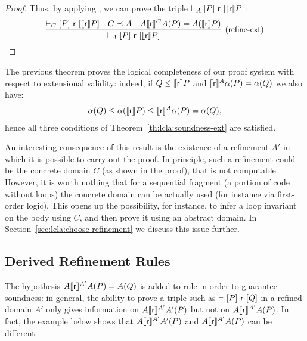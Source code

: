 \begin{proof}
	Thus, by applying , we can prove the triple $\vdash_{A}\nobreak[P]~\mathsf{r}~[\llbracket\mathsf{r}\rrbracket P]$:
	\[
	\infer[(\mathsf{refine\mbox{-}ext})]
	{\lcl{A}{P}{\regr}{\denot{\regr} P}}
	{\lcl{C}{P}{\regr}{\denot{\regr} P} & C \preceq A & A \denot{\regr}^{C} A(P) = A(\denot{\regr} P)}
	\]
\end{proof}

The previous theorem proves the logical completeness of our proof system with respect to extensional validity: indeed, if $Q \le \llbracket\mathsf{r}\rrbracket P$ and $\llbracket\mathsf{r}\rrbracket^A \alpha(P) = \alpha(Q)$ we also have:
\begin{align*}
	\alpha(Q) \le \alpha(\llbracket\mathsf{r}\rrbracket P) \le \llbracket\mathsf{r}\rrbracket^{A} \alpha(P) = \alpha(Q) ,
\end{align*}
hence all three conditions of Theorem~\ref{th:lcla:soundness-ext} are satisfied.

An interesting consequence of this result is the existence of a refinement $A'$ in which it is possible to carry out the proof. In principle, such a refinement could be the concrete domain $C$ (as shown in the proof), that is not computable. However, it is worth nothing that for a sequential fragment (a portion of code without loops) the concrete domain can be actually used (for instance via first-order logic). This opens up the possibility, for instance, to infer a loop invariant on the body using $C$, and then prove it using an abstract domain.
In Section~\ref{sec:lcla:choose-refinement} we discuss this issue further.

\subsection{Derived Refinement Rules}\label{sec:lcla:derived-rules}

The hypothesis $A \llbracket\mathsf{r}\rrbracket^{A'} A(P) = A(Q)$ is added to rule  in order to guarantee soundness: in general, the ability to prove a triple such as $\vdash_{}\nobreak[P]~\mathsf{r}~[Q]$ in a refined domain $A'$ only gives information on $A \llbracket\mathsf{r}\rrbracket^{A'} A'(P)$ but not on $A \llbracket\mathsf{r}\rrbracket^{A'} A(P)$. In fact, the example below shows that $A \llbracket\mathsf{r}\rrbracket^{A'} A'(P) $ and $A \llbracket\mathsf{r}\rrbracket^{A'} A(P)$ can be different.

